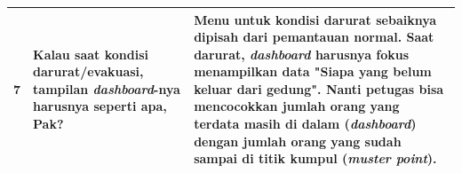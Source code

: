 \begin{longtable}{|c|p{}|p{}|}
7 & Kalau saat kondisi darurat/evakuasi, tampilan \textit{dashboard}-nya harusnya seperti apa, Pak? & Menu untuk kondisi darurat sebaiknya dipisah dari pemantauan normal. Saat darurat, \textit{dashboard} harusnya fokus menampilkan data "Siapa yang belum keluar dari gedung". Nanti petugas bisa mencocokkan jumlah orang yang terdata masih di dalam (\textit{dashboard}) dengan jumlah orang yang sudah sampai di titik kumpul (\textit{muster point}). \\ \hline
\end{longtable}
